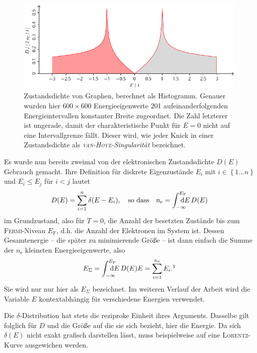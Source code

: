 \documentclass[a4paper, 10pt, twoside, openany]{book} %
\newcommand \braces[1]{\left \lbrace #1 \right \rbrace}
\def \D {\mathrm d}
\def \nE {n_\mathrm{e}}
\begin{document}
	\begin{figure}
		\includegraphics[width=\textwidth]{Abbildungen/Bandstrukturen/DOS_C2.pdf}
		\caption[Zustandsdichte von Graphen]{Zustandsdichte von Graphen, berechnet als Histogramm. Genauer wurden hier $600 \times 600$ Energieeigenwerte 201 aufeinanderfolgenden Energieintervallen konstanter Breite zugeordnet. Die Zahl letzterer ist ungerade, damit der charakteristische Punkt für $E = 0$ nicht auf eine Intervallgrenze fällt. Dieser wird, wie jeder Knick in einer Zustandsdichte als \emph{\textsc{van-Hove}-Singularität} \cite{vanHove} bezeichnet.}
		\label{DOS Graphen}
	\end{figure}
	Es wurde nun bereits zweimal von der elektronischen Zustandsdichte $D(E)$ Gebrauch gemacht. Ihre Definition für diskrete Eigenzustände $E_i$ mit $i \in \braces{1 \dots n}$ und $E_i \leq E_j$ für $i < j$ lautet
	\begin{align*}
		D(E) = \sum_{i = 1}^n \delta(E - E_i), \quad \text{so dass} \quad \nE = \int_{\mathrlap{-\infty}}^{\mathrlap{E_\mathrm{F}}} \D E \, D(E)
	\end{align*}
	im Grundzustand, also für $T = 0$, die Anzahl der besetzten Zustände bis zum \textsc{Fermi}-Niveau $E_\mathrm{F}$, d.h. die Anzahl der Elektronen im System ist. Dessen Gesamtenergie -- die später zu minimierende Größe -- ist dann einfach die Summe der $\nE$ kleinsten Energieeigenwerte, also
	\begin{align*}
		E_\Sigma = \int_{\mathrlap{-\infty}}^{\mathrlap{E_\mathrm{F}}} \D E \, D(E) E = \sum_{i = 1}^{\nE} E_i.\footnotemark
	\end{align*}
	Sie wird nur nur hier als $E_\Sigma$ bezeichnet. Im weiteren Verlauf der Arbeit wird die Variable $E$ kontextabhängig für verschiedene Energien verwendet.
	
	Die $\delta$-Distribution hat stets die reziproke Einheit ihres Arguments. Dasselbe gilt folglich für $D$ und die Größe auf die sie sich bezieht, hier die Energie. Da sich $\delta(E)$ nicht exakt grafisch darstellen lässt, muss beispielweise auf eine \textsc{Lorentz}-Kurve ausgewichen werden.
	
\end{document}
